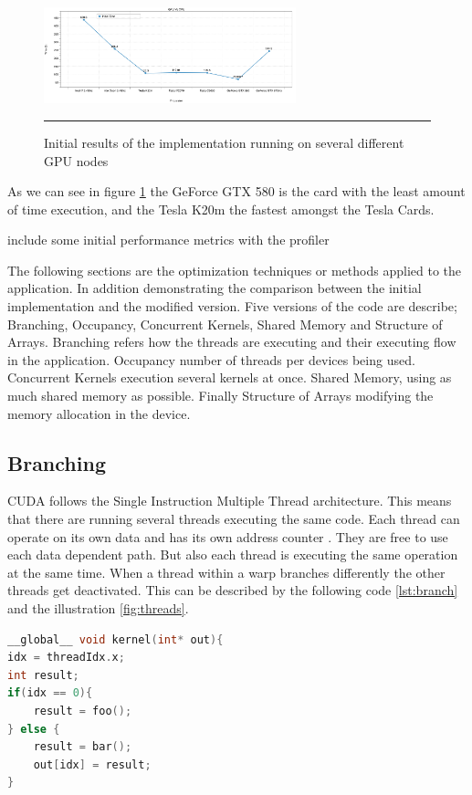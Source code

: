   \begin{figure}[htbp]
	\centering
		\includegraphics[width=0.65\textwidth]{Figures/gpu_initial.png}
		\rule{35em}{0.2pt}
	\caption[Initial GPU results]{Initial results of the implementation running on several different GPU nodes}
	\label{fig:iniresults}
\end{figure}

As we can see in figure \ref{fig:iniresults} the GeForce GTX 580 is the card with the least amount of time execution, and the Tesla K20m the fastest amongst the Tesla Cards. 


include some initial performance metrics with the profiler

The following sections are the optimization techniques or methods applied to the application. In addition demonstrating the comparison between the initial implementation and the modified version. Five versions of the code are describe; Branching, Occupancy, Concurrent Kernels, Shared Memory and Structure of Arrays. Branching refers how the threads are executing and their executing flow in the application. Occupancy number of threads per devices being used. Concurrent Kernels execution several kernels at once. Shared Memory, using as much shared memory as possible. Finally Structure of Arrays modifying the memory allocation in the device.

 \subsection{Branching}
 
 CUDA follows the Single Instruction Multiple Thread architecture. This means that there are running several threads executing the same code. Each thread can operate on its own data and has its own address counter . They are free to use each data dependent path. But also each thread is executing the same operation at the same time. When a thread within a warp branches differently the other threads get deactivated\cite{hoermanngpu}. This can be described by the following code \ref{lst:branch} and the illustration \ref{fig:threads}.

\begin{lstlisting}[language=C++, label={lst:branch}, caption={Threads Branching}]
__global__ void kernel(int* out){
idx = threadIdx.x;
int result;
if(idx == 0){
	result = foo();
} else {
	result = bar();
	out[idx] = result;
}
\end{lstlisting}

